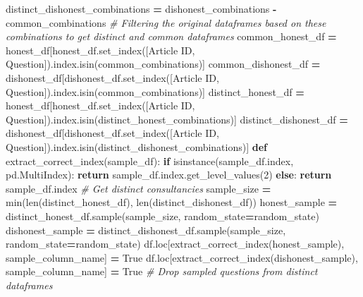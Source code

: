 \documentclass[
]{article}
\newenvironment{Shaded}{\begin{snugshade}}{\end{snugshade}}
\newcommand{\BuiltInTok}[1]{#1}
\newcommand{\CommentTok}[1]{\textcolor[rgb]{0.56,0.35,0.01}{\textit{#1}}}
\newcommand{\ControlFlowTok}[1]{\textcolor[rgb]{0.13,0.29,0.53}{\textbf{#1}}}
\newcommand{\DecValTok}[1]{\textcolor[rgb]{0.00,0.00,0.81}{#1}}
\newcommand{\KeywordTok}[1]{\textcolor[rgb]{0.13,0.29,0.53}{\textbf{#1}}}
\newcommand{\NormalTok}[1]{#1}
\newcommand{\OperatorTok}[1]{\textcolor[rgb]{0.81,0.36,0.00}{\textbf{#1}}}
\newcommand{\StringTok}[1]{\textcolor[rgb]{0.31,0.60,0.02}{#1}}
\newcommand{\VariableTok}[1]{\textcolor[rgb]{0.00,0.00,0.00}{#1}}
\begin{document}
\begin{Shaded}
\begin{Highlighting}[]
\NormalTok{    distinct\_dishonest\_combinations }\OperatorTok{=}\NormalTok{ dishonest\_combinations }\OperatorTok{{-}}\NormalTok{ common\_combinations}
    \CommentTok{\# Filtering the original dataframes based on these combinations to get distinct and common dataframes}
\NormalTok{    common\_honest\_df }\OperatorTok{=}\NormalTok{ honest\_df[honest\_df.set\_index([}\StringTok{\textquotesingle{}Article ID\textquotesingle{}}\NormalTok{, }\StringTok{\textquotesingle{}Question\textquotesingle{}}\NormalTok{]).index.isin(common\_combinations)]}
\NormalTok{    common\_dishonest\_df }\OperatorTok{=}\NormalTok{ dishonest\_df[dishonest\_df.set\_index([}\StringTok{\textquotesingle{}Article ID\textquotesingle{}}\NormalTok{, }\StringTok{\textquotesingle{}Question\textquotesingle{}}\NormalTok{]).index.isin(common\_combinations)]}
\NormalTok{    distinct\_honest\_df }\OperatorTok{=}\NormalTok{ honest\_df[honest\_df.set\_index([}\StringTok{\textquotesingle{}Article ID\textquotesingle{}}\NormalTok{, }\StringTok{\textquotesingle{}Question\textquotesingle{}}\NormalTok{]).index.isin(distinct\_honest\_combinations)]}
\NormalTok{    distinct\_dishonest\_df }\OperatorTok{=}\NormalTok{ dishonest\_df[dishonest\_df.set\_index([}\StringTok{\textquotesingle{}Article ID\textquotesingle{}}\NormalTok{, }\StringTok{\textquotesingle{}Question\textquotesingle{}}\NormalTok{]).index.isin(distinct\_dishonest\_combinations)]}
    \KeywordTok{def}\NormalTok{ extract\_correct\_index(sample\_df):}
        \ControlFlowTok{if} \BuiltInTok{isinstance}\NormalTok{(sample\_df.index, pd.MultiIndex):}
            \ControlFlowTok{return}\NormalTok{ sample\_df.index.get\_level\_values(}\DecValTok{2}\NormalTok{)}
        \ControlFlowTok{else}\NormalTok{:}
            \ControlFlowTok{return}\NormalTok{ sample\_df.index}
    \CommentTok{\# Get distinct consultancies}
\NormalTok{    sample\_size }\OperatorTok{=} \BuiltInTok{min}\NormalTok{(}\BuiltInTok{len}\NormalTok{(distinct\_honest\_df), }\BuiltInTok{len}\NormalTok{(distinct\_dishonest\_df))}
\NormalTok{    honest\_sample }\OperatorTok{=}\NormalTok{ distinct\_honest\_df.sample(sample\_size, random\_state}\OperatorTok{=}\NormalTok{random\_state)}
\NormalTok{    dishonest\_sample }\OperatorTok{=}\NormalTok{ distinct\_dishonest\_df.sample(sample\_size, random\_state}\OperatorTok{=}\NormalTok{random\_state)}
\NormalTok{    df.loc[extract\_correct\_index(honest\_sample), sample\_column\_name] }\OperatorTok{=} \VariableTok{True}
\NormalTok{    df.loc[extract\_correct\_index(dishonest\_sample), sample\_column\_name] }\OperatorTok{=} \VariableTok{True}
    \CommentTok{\# Drop sampled questions from distinct dataframes}

\end{Highlighting}
\end{Shaded}
\end{document}

